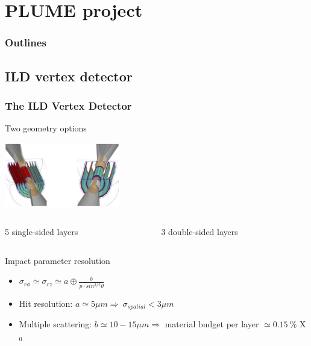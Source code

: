 \documentclass{beamer}
\begin{document}
\section{PLUME project}
\begin{frame}
    \frametitle{Outlines}
    \tableofcontents[currentsection,hideothersubsections, 
    sectionstyle=show/shaded,]
\end{frame}

  \subsection{ILD vertex detector}
  \begin{frame}[label=vxd]
    \frametitle{The ILD Vertex Detector}

    \vspace{-0.3cm}
    \begin{block}{Two geometry options}
      \begin{center}
        \includegraphics[width = 6 cm,height = 2.8cm]{Pictures/ild_VXD.png}
      \end{center}
      \vspace{-0.5cm}
      \begin{columns}[t]
        \begin{column}{5cm}
          5 single-sided layers
        \end{column}
        \begin{column}{5cm}
          3 double-sided layers
        \end{column}
      \end{columns}
    \end{block}

    \vspace{-0.2cm}
    \begin{alertblock}{Impact parameter resolution}
      \begin{itemize}
        \item $\sigma_{r\phi} \simeq \sigma_{rz} \simeq a \oplus \frac{b}{p \cdot sin^{3/2} \theta}$
        \item Hit resolution: $a \simeq 5 \mu m \Rightarrow ~ \sigma_{spatial} < 3 \mu m$
        \item Multiple scattering: $b \simeq 10 - 15 \mu m \Rightarrow$ material budget per layer $\simeq 0.15~\%$ X$_0$ 
      \end{itemize}
    \end{alertblock}
\end{frame}
\end{document}
